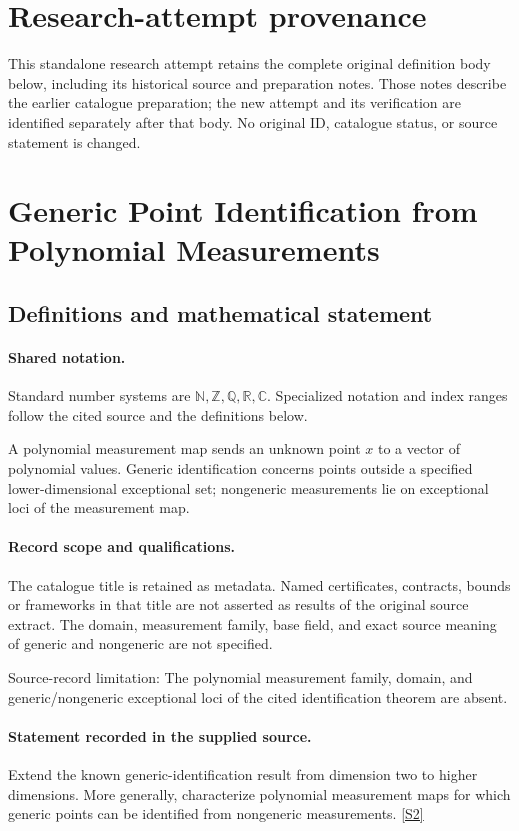 \documentclass[11pt]{article}
\begin{document}
\section*{Research-attempt provenance}
This standalone research attempt retains the complete original definition body below,
including its historical source and preparation notes. Those notes describe the
earlier catalogue preparation; the new attempt and its verification are identified
separately after that body. No original ID, catalogue status, or source statement is changed.

\section{Generic Point Identification from Polynomial Measurements}\label{statement}

\subsection{Definitions and mathematical statement}

\paragraph{Shared notation.}Standard number systems are $\mathbb N,\mathbb Z,\mathbb Q,\mathbb R,\mathbb C$. Specialized notation and index ranges follow the cited source and the definitions below.


A polynomial measurement map sends an unknown point $x$ to a vector of polynomial values. Generic identification concerns points outside a specified lower-dimensional exceptional set; nongeneric measurements lie on exceptional loci of the measurement map.
\paragraph{Record scope and qualifications.}
The catalogue title is retained as metadata. Named certificates, contracts, bounds or frameworks in that title are not asserted as results of the original source extract.
The domain, measurement family, base field, and exact source meaning of generic and nongeneric are not specified.

Source-record limitation: The polynomial measurement family, domain, and generic/nongeneric exceptional loci of the cited identification theorem are absent.
\paragraph{Statement recorded in the supplied source.}
Extend the known generic-identification result from dimension two to higher dimensions. More generally, characterize polynomial measurement maps for which generic points can be identified from nongeneric measurements. \href{https://doi.org/10.4171/owr/2025/9}{[S2]}
\end{document}
